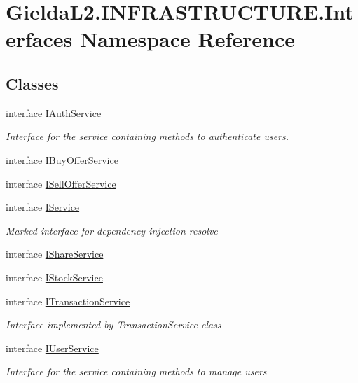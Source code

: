 \hypertarget{namespace_gielda_l2_1_1_i_n_f_r_a_s_t_r_u_c_t_u_r_e_1_1_interfaces}{}\section{Gielda\+L2.\+I\+N\+F\+R\+A\+S\+T\+R\+U\+C\+T\+U\+R\+E.\+Interfaces Namespace Reference}
\label{namespace_gielda_l2_1_1_i_n_f_r_a_s_t_r_u_c_t_u_r_e_1_1_interfaces}
\subsection*{Classes}
\begin{DoxyCompactItemize}
\item 
interface \mbox{\hyperlink{interface_gielda_l2_1_1_i_n_f_r_a_s_t_r_u_c_t_u_r_e_1_1_interfaces_1_1_i_auth_service}{I\+Auth\+Service}}
\begin{DoxyCompactList}\small\item\em Interface for the service containing methods to authenticate users. \end{DoxyCompactList}\item 
interface \mbox{\hyperlink{interface_gielda_l2_1_1_i_n_f_r_a_s_t_r_u_c_t_u_r_e_1_1_interfaces_1_1_i_buy_offer_service}{I\+Buy\+Offer\+Service}}
\item 
interface \mbox{\hyperlink{interface_gielda_l2_1_1_i_n_f_r_a_s_t_r_u_c_t_u_r_e_1_1_interfaces_1_1_i_sell_offer_service}{I\+Sell\+Offer\+Service}}
\item 
interface \mbox{\hyperlink{interface_gielda_l2_1_1_i_n_f_r_a_s_t_r_u_c_t_u_r_e_1_1_interfaces_1_1_i_service}{I\+Service}}
\begin{DoxyCompactList}\small\item\em Marked interface for dependency injection resolve \end{DoxyCompactList}\item 
interface \mbox{\hyperlink{interface_gielda_l2_1_1_i_n_f_r_a_s_t_r_u_c_t_u_r_e_1_1_interfaces_1_1_i_share_service}{I\+Share\+Service}}
\item 
interface \mbox{\hyperlink{interface_gielda_l2_1_1_i_n_f_r_a_s_t_r_u_c_t_u_r_e_1_1_interfaces_1_1_i_stock_service}{I\+Stock\+Service}}
\item 
interface \mbox{\hyperlink{interface_gielda_l2_1_1_i_n_f_r_a_s_t_r_u_c_t_u_r_e_1_1_interfaces_1_1_i_transaction_service}{I\+Transaction\+Service}}
\begin{DoxyCompactList}\small\item\em Interface implemented by Transaction\+Service class \end{DoxyCompactList}\item 
interface \mbox{\hyperlink{interface_gielda_l2_1_1_i_n_f_r_a_s_t_r_u_c_t_u_r_e_1_1_interfaces_1_1_i_user_service}{I\+User\+Service}}
\begin{DoxyCompactList}\small\item\em Interface for the service containing methods to manage users \end{DoxyCompactList}\end{DoxyCompactItemize}
